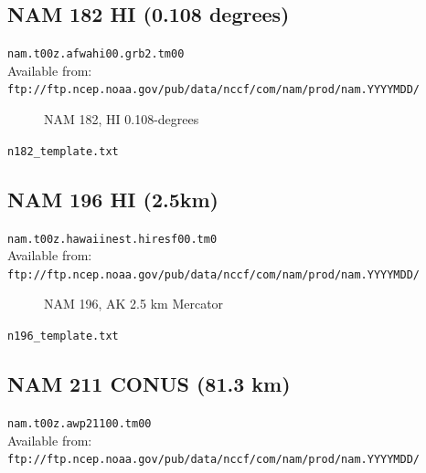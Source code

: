 \documentclass[11pt]{article}   %
\begin{document}
\clearpage
\subsection{NAM 182 HI (0.108 degrees)}

\verb|nam.t00z.afwahi00.grb2.tm00|\\
Available from:\\
\verb|ftp://ftp.ncep.noaa.gov/pub/data/nccf/com/nam/prod/nam.YYYYMDD/|

\begin{figure}[htbp]\begin{center}
\parbox{15cm}{\caption{\label{FigNAM182}
NAM 182, HI 0.108-degrees
}}
\end{center}\end{figure}
\clearpage
\verb|n182_template.txt| \\
\tiny  \normalsize


\clearpage
\subsection{NAM 196 HI (2.5km)}

\verb|nam.t00z.hawaiinest.hiresf00.tm0|\\
Available from:\\
\verb|ftp://ftp.ncep.noaa.gov/pub/data/nccf/com/nam/prod/nam.YYYYMDD/|

\begin{figure}[htbp]\begin{center}
\parbox{15cm}{\caption{\label{FigNAM196}
NAM 196, AK 2.5 km Mercator
}}
\end{center}\end{figure}
\clearpage
\verb|n196_template.txt| \\
\tiny  \normalsize

\clearpage
\subsection{NAM 211 CONUS (81.3 km)}

\verb|nam.t00z.awp21100.tm00|\\
Available from:\\
\verb|ftp://ftp.ncep.noaa.gov/pub/data/nccf/com/nam/prod/nam.YYYYMDD/|
\end{document}
